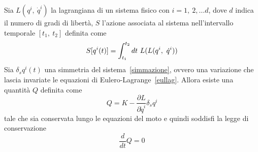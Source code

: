     \begin{theorem}
        Sia $L(q^i,~\dot q^i)$ la lagrangiana di un sistema fisico con $i=1,~2,\ldots d$, dove $d$ indica il numero di gradi di libertà, $S$ l'azione associata al sistema nell'intervallo temporale $[t_1,~t_2]$ definita come
    \begin{equation*}
        S[q^i(t)] = \int_{t_1}^{t_2}dt~ L(L(q^i,~\dot q^i))
    \end{equation*}
        Sia $\delta_s q^i(t)$ una simmetria del sistema~\eqref{simmazione}, ovvero una variazione che lascia invariate le equazioni di Eulero-Lagrange~\eqref{eullag}. Allora esiste una quantità $Q$ definita come
    \begin{equation}\label{carica}
        Q = K - \frac{\partial L}{\partial \dot q^i} \delta_s q^i
    \end{equation}
        tale che sia conservata lungo le equazioni del moto e quindi soddisfi la legge di conservazione
    \begin{equation} \label{th}
        \frac{d}{dt} Q = 0
    \end{equation}
    \end{theorem}

